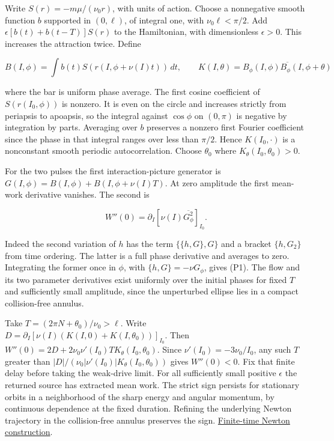 \documentclass[11pt,a4paper]{article}
\begin{document}
Write \(S(r)=-m\mu/(\nu_0 r)\), with units of action. Choose a
nonnegative smooth function \(b\) supported in \((0,\ell)\), of integral
one, with \(\nu_0\ell<\pi/2\). Add \(\epsilon [b(t)+b(t-T)] S(r)\) to
the Hamiltonian, with dimensionless \(\epsilon>0\). This increases the
attraction twice. Define

\[
 B(I,\phi)=\int b(t)S(r(I,\phi+\nu(I)t))\,dt,\qquad
 K(I,\theta)=\overline{B_\phi(I,\phi)B_\phi(I,\phi+\theta)}
\]

where the bar is uniform phase average. The first cosine coefficient of
\(S(r(I_0,\phi))\) is nonzero. It is even on the circle and increases
strictly from periapsis to apoapsis, so the integral against
\(\cos\phi\) on \((0,\pi)\) is negative by integration by parts.
Averaging over \(b\) preserves a nonzero first Fourier coefficient since
the phase in that integral ranges over less than \(\pi/2\). Hence
\(K(I_0,\cdot)\) is a nonconstant smooth periodic autocorrelation.
Choose \(\theta_0\) where \(K_\theta(I_0,\theta_0)>0\).

For the two pulses the first interaction-picture generator is
\(G(I,\phi)=B(I,\phi)+B(I,\phi+\nu(I)T)\). At zero amplitude the first
mean-work derivative vanishes. The second is

\[
 W''(0)=\partial_I\!\left[\nu(I)\overline{G_\phi^2}\right]_{I_0}.
 \tag{P1}
\]

Indeed the second variation of \(h\) has the term \(\{\{h,G\},G\}\) and
a bracket \(\{h,G_2\}\) from time ordering. The latter is a full phase
derivative and averages to zero. Integrating the former once in
\(\phi\), with \(\{h,G\}=-\nu G_\phi\), gives (P1). The flow and its two
parameter derivatives exist uniformly over the initial phases for fixed
\(T\) and sufficiently small amplitude, since the unperturbed ellipse
lies in a compact collision-free annulus.

Take \(T=(2\pi N+\theta_0)/\nu_0>\ell\). Write
\(D=\partial_I[\nu(I)(K(I,0)+K(I,\theta_0))]_{I_0}\). Then
\(W''(0)=2D+2\nu_0\nu'(I_0)T K_\theta(I_0,\theta_0)\). Since
\(\nu'(I_0)=-3\nu_0/I_0\), any such \(T\) greater than
\(|D|/(\nu_0|\nu'(I_0)| K_\theta(I_0,\theta_0))\) gives \(W''(0)<0\).
Fix that finite delay before taking the weak-drive limit. For all
sufficiently small positive \(\epsilon\) the returned source has
extracted mean work. The strict sign persists for stationary orbits in a
neighborhood of the sharp energy and angular momentum, by continuous
dependence at the fixed duration. Refining the underlying Newton
trajectory in the collision-free annulus preserves the sign.
\href{balaban-ode-lesson.md}{Finite-time Newton construction}.
\end{document}
